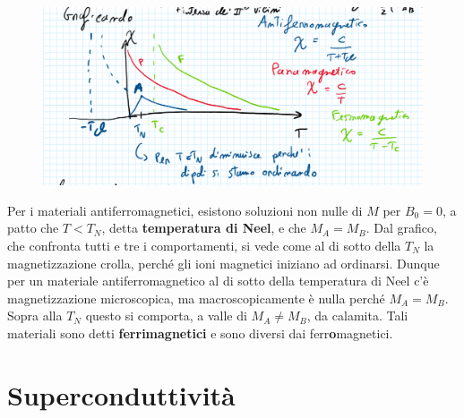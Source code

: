 \documentclass{book}
\begin{document}
        \begin{figure}[h!]
            \centering
            \includegraphics[width=0.75\linewidth]{img/pippard.png}
        \end{figure}
        Per i materiali antiferromagnetici, esistono soluzioni non nulle di $M$ per $B_{0} = 0$, a patto che $T<T_{N}$, detta \textbf{temperatura di Neel}, e che $M_{A} = M_{B}$. Dal grafico, che confronta tutti e tre i comportamenti, si vede come al di sotto della $T_{N}$ la magnetizzazione crolla, perché gli ioni magnetici iniziano ad ordinarsi. Dunque per un materiale antiferromagnetico al di sotto della temperatura di Neel c'è magnetizzazione microscopica, ma macroscopicamente è nulla perché $M_{A} = M_{B}$. Sopra alla $T_{N}$ questo si comporta, a valle di $M_{A} \neq M_{B}$, da calamita. Tali materiali sono detti \textbf{ferrimagnetici} e sono diversi dai ferr\textbf{o}magnetici.

\chapter{Superconduttività}
\end{document}
